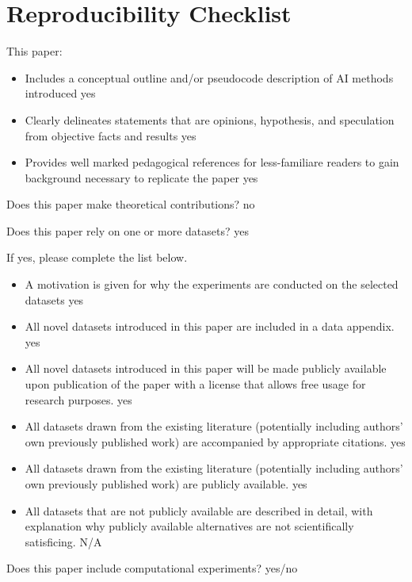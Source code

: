 \section{Reproducibility Checklist}
This paper:
\begin{itemize}
    \item Includes a conceptual outline and/or pseudocode description of AI methods introduced yes
    \item Clearly delineates statements that are opinions, hypothesis, and speculation from objective facts and results yes
    \item Provides well marked pedagogical references for less-familiare readers to gain background necessary to replicate the paper yes
\end{itemize}

Does this paper make theoretical contributions? no

Does this paper rely on one or more datasets? yes

If yes, please complete the list below.
\begin{itemize}
    \item A motivation is given for why the experiments are conducted on the selected datasets yes
    \item All novel datasets introduced in this paper are included in a data appendix. yes
    \item All novel datasets introduced in this paper will be made publicly available upon publication of the paper with a license that allows free usage for research purposes. yes
    \item All datasets drawn from the existing literature (potentially including authors’ own previously published work) are accompanied by appropriate citations. yes
    \item All datasets drawn from the existing literature (potentially including authors’ own previously published work) are publicly available. yes
    \item All datasets that are not publicly available are described in detail, with explanation why publicly available alternatives are not scientifically satisficing. N/A
\end{itemize}

Does this paper include computational experiments? yes/no

